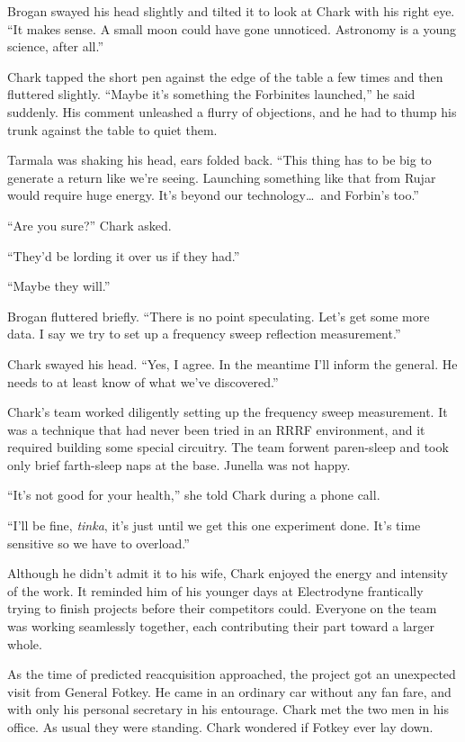 Brogan swayed his head slightly and tilted it to look at Chark with his right eye. ``It makes
sense. A small moon could have gone unnoticed. Astronomy is a young science, after all.''

Chark tapped the short pen against the edge of the table a few times and then fluttered
slightly. ``Maybe it's something the Forbinites launched,'' he said suddenly. His comment
unleashed a flurry of objections, and he had to thump his trunk against the table to quiet them.

Tarmala was shaking his head, ears folded back. ``This thing has to be big to generate a return
like we're seeing. Launching something like that from Rujar would require huge energy. It's
beyond our technology\ldots\ and Forbin's too.''

``Are you sure?'' Chark asked.

``They'd be lording it over us if they had.''

``Maybe they will.''

Brogan fluttered briefly. ``There is no point speculating. Let's get some more data. I say we
try to set up a frequency sweep reflection measurement.''

Chark swayed his head. ``Yes, I agree. In the meantime I'll inform the general. He needs to at
least know of what we've discovered.''

\spacebreak

Chark's team worked diligently setting up the frequency sweep measurement. It was a technique
that had never been tried in an RRRF environment, and it required building some special
circuitry. The team forwent paren-sleep and took only brief farth-sleep naps at the base.
Junella was not happy.

``It's not good for your health,'' she told Chark during a phone call.

``I'll be fine, \textit{tinka}, it's just until we get this one experiment done. It's time
sensitive so we have to overload.''

Although he didn't admit it to his wife, Chark enjoyed the energy and intensity of the work. It
reminded him of his younger days at Electrodyne frantically trying to finish projects before
their competitors could. Everyone on the team was working seamlessly together, each contributing
their part toward a larger whole.

As the time of predicted reacquisition approached, the project got an unexpected visit from
General Fotkey. He came in an ordinary car without any fan fare, and with only his personal
secretary in his entourage. Chark met the two men in his office. As usual they were standing.
Chark wondered if Fotkey ever lay down.

